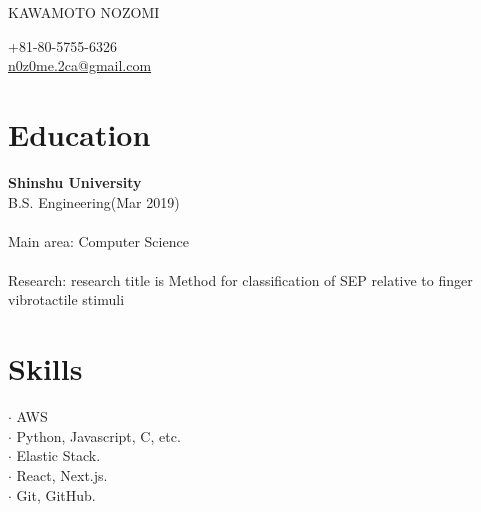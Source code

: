 \documentclass[11pt]{article} %
\begin{document}

\parbox[top][0.12\textheight][c]{\linewidth}{ %
	\vspace{-0.04\textheight} %
	{\color{name}\Huge KAWAMOTO NOZOMI}\\\medskip %
}

\begin{paracol}{2} %

{\faPhone} \hspace{1mm} +81-80-5755-6326 \\ %
{\small\faEnvelope} \hspace{1mm} \href{mailto:n0z0me.2ca@gmail.com}{\small n0z0me.2ca@gmail.com} \\ %

\vspace{1cm}

\section{\Large Education}
\textbf{\color{subtitle}\large Shinshu University}\\
B.S. Engineering(Mar 2019)\\
\\
Main area: Computer Science\\
\\
Research: research title is Method for classification of SEP relative to finger vibrotactile stimuli\\

\vspace{1cm}

\section{\Large Skills}
$\cdot$ AWS\\
$\cdot$ Python, Javascript, C, etc.\\
$\cdot$ Elastic Stack.\\
$\cdot$ React, Next.js.\\
$\cdot$ Git, GitHub.\\


\end{paracol}
\end{document}
